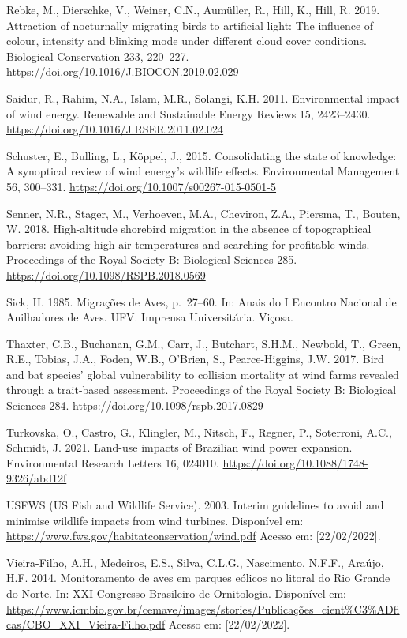 \documentclass[
  oneside]{scrbook}
\begin{document}
Rebke, M., Dierschke, V., Weiner, C.N., Aumüller, R., Hill, K., Hill, R. 2019. Attraction of nocturnally migrating birds to artificial light: The influence of colour, intensity and blinking mode under different cloud cover conditions. Biological Conservation 233, 220--227. \url{https://doi.org/10.1016/J.BIOCON.2019.02.029}

Saidur, R., Rahim, N.A., Islam, M.R., Solangi, K.H. 2011. Environmental impact of wind energy. Renewable and Sustainable Energy Reviews 15, 2423--2430. \url{https://doi.org/10.1016/J.RSER.2011.02.024}

Schuster, E., Bulling, L., Köppel, J., 2015. Consolidating the state of knowledge: A synoptical review of wind energy's wildlife effects. Environmental Management 56, 300--331. \url{https://doi.org/10.1007/s00267-015-0501-5}

Senner, N.R., Stager, M., Verhoeven, M.A., Cheviron, Z.A., Piersma, T., Bouten, W. 2018. High-altitude shorebird migration in the absence of topographical barriers: avoiding high air temperatures and searching for profitable winds. Proceedings of the Royal Society B: Biological Sciences 285. \url{https://doi.org/10.1098/RSPB.2018.0569}

Sick, H. 1985. Migrações de Aves, p.~27--60. In: Anais do I Encontro Nacional de Anilhadores de Aves. UFV. Imprensa Universitária. Viçosa.

Thaxter, C.B., Buchanan, G.M., Carr, J., Butchart, S.H.M., Newbold, T., Green, R.E., Tobias, J.A., Foden, W.B., O'Brien, S., Pearce-Higgins, J.W. 2017. Bird and bat species' global vulnerability to collision mortality at wind farms revealed through a trait-based assessment. Proceedings of the Royal Society B: Biological Sciences 284. \url{https://doi.org/10.1098/rspb.2017.0829}

Turkovska, O., Castro, G., Klingler, M., Nitsch, F., Regner, P., Soterroni, A.C., Schmidt, J. 2021. Land-use impacts of Brazilian wind power expansion. Environmental Research Letters 16, 024010. \url{https://doi.org/10.1088/1748-9326/abd12f}

USFWS (US Fish and Wildlife Service). 2003. Interim guidelines to avoid and minimise wildlife impacts from wind turbines. Disponível em: \url{https://www.fws.gov/habitatconservation/wind.pdf} Acesso em: {[}22/02/2022{]}.

Vieira-Filho, A.H., Medeiros, E.S., Silva, C.L.G., Nascimento, N.F.F., Araújo, H.F. 2014. Monitoramento de aves em parques eólicos no litoral do Rio Grande do Norte. In: XXI Congresso Brasileiro de Ornitologia. Disponível em: \url{https://www.icmbio.gov.br/cemave/images/stories/Publicações_cient\%C3\%ADficas/CBO_XXI_Vieira-Filho.pdf} Acesso em: {[}22/02/2022{]}.
\end{document}
